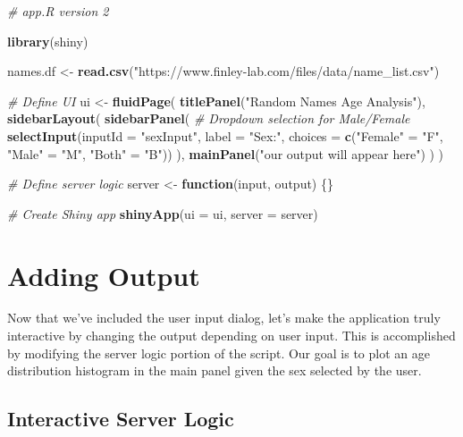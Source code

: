 \documentclass[
]{krantz}
\newenvironment{Shaded}{\begin{snugshade}}{\end{snugshade}}
\newcommand{\CommentTok}[1]{\textcolor[rgb]{0.56,0.35,0.01}{\textit{#1}}}
\newcommand{\ControlFlowTok}[1]{\textcolor[rgb]{0.13,0.29,0.53}{\textbf{#1}}}
\newcommand{\DataTypeTok}[1]{\textcolor[rgb]{0.13,0.29,0.53}{#1}}
\newcommand{\KeywordTok}[1]{\textcolor[rgb]{0.13,0.29,0.53}{\textbf{#1}}}
\newcommand{\NormalTok}[1]{#1}
\newcommand{\StringTok}[1]{\textcolor[rgb]{0.31,0.60,0.02}{#1}}
\begin{document}
\begin{Shaded}
\begin{Highlighting}[]
\CommentTok{\# app.R version 2}

\KeywordTok{library}\NormalTok{(shiny)}

\NormalTok{names.df \textless{}{-}}\StringTok{ }\KeywordTok{read.csv}\NormalTok{(}\StringTok{"https://www.finley{-}lab.com/files/data/name\_list.csv"}\NormalTok{)}

\CommentTok{\# Define UI}
\NormalTok{ui \textless{}{-}}\StringTok{ }\KeywordTok{fluidPage}\NormalTok{(}
  \KeywordTok{titlePanel}\NormalTok{(}\StringTok{"Random Names Age Analysis"}\NormalTok{),}
  \KeywordTok{sidebarLayout}\NormalTok{(}
    \KeywordTok{sidebarPanel}\NormalTok{(}
      \CommentTok{\# Dropdown selection for Male/Female}
      \KeywordTok{selectInput}\NormalTok{(}\DataTypeTok{inputId =} \StringTok{"sexInput"}\NormalTok{, }\DataTypeTok{label =} \StringTok{"Sex:"}\NormalTok{,}
                  \DataTypeTok{choices =} \KeywordTok{c}\NormalTok{(}\StringTok{"Female"}\NormalTok{ =}\StringTok{ "F"}\NormalTok{, }
                              \StringTok{"Male"}\NormalTok{ =}\StringTok{ "M"}\NormalTok{, }
                              \StringTok{"Both"}\NormalTok{ =}\StringTok{ "B"}\NormalTok{))}
\NormalTok{    ),}
    \KeywordTok{mainPanel}\NormalTok{(}\StringTok{"our output will appear here"}\NormalTok{)}
\NormalTok{  )}
\NormalTok{)}

\CommentTok{\# Define server logic}
\NormalTok{server \textless{}{-}}\StringTok{ }\ControlFlowTok{function}\NormalTok{(input, output) \{\}}

\CommentTok{\# Create Shiny app}
\KeywordTok{shinyApp}\NormalTok{(}\DataTypeTok{ui =}\NormalTok{ ui, }\DataTypeTok{server =}\NormalTok{ server)}
\end{Highlighting}
\end{Shaded}

\hypertarget{adding-output}{%
\section{Adding Output}\label{adding-output}}

Now that we've included the user input dialog, let's make the application truly interactive by changing the output depending on user input. This is accomplished by modifying the server logic portion of the script. Our goal is to plot an age distribution histogram in the main panel given the sex selected by the user.

\hypertarget{interactive-server-logic}{%
\subsection{Interactive Server Logic}\label{interactive-server-logic}}
\end{document}
